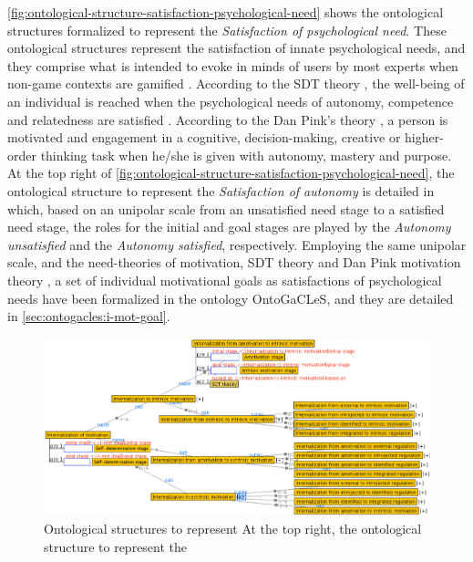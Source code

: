 \autoref{fig:ontological-structure-satisfaction-psychological-need} shows the ontological structures formalized to represent the \emph{Satisfaction of psychological need}.
These ontological structures represent the satisfaction of innate psychological needs, and they comprise what is intended to evoke in minds of users by most experts when non-game contexts are gamified \cite{MoraRieraGonzalezArnedo-Moreno2015,SeabornFels2015}.
According to the SDT theory \cite{RyanDeci2000,DeciRyan2010}, the well-being of an individual is reached when the psychological needs of autonomy, competence and relatedness are satisfied \cite{DeciRyan1985, DeciRyan2010}.
According to the Dan Pink's theory \cite{Pink2011}, a person is motivated and engagement in a cognitive, decision-making, creative or higher-order thinking task when he/she is given with autonomy, mastery and purpose.
At the top right of \autoref{fig:ontological-structure-satisfaction-psychological-need}, the ontological structure to represent the \emph{Satisfaction of autonomy} is detailed in which, based on an unipolar scale from an unsatisfied need stage to a satisfied need stage, the roles for the initial and goal stages are played by the \emph{Autonomy unsatisfied} and the \emph{Autonomy satisfied}, respectively.
Employing the same unipolar scale, and the need-theories of motivation, SDT theory \cite{DeciRyan2010} and Dan Pink motivation theory \cite{Pink2011}, a set of individual motivational goals as satisfactions of psychological needs have been formalized in the ontology OntoGaCLeS, and they are detailed in \autoref{sec:ontogacles:i-mot-goal}.

\begin{figure}[!htbp]
 \caption[Ontological structures to represent internalization of motivation]{Ontological structures to represent  At the top right, the ontological structure to represent the }
 \label{fig:ontological-structure-internalization-motivation}
 \centering
 \includegraphics[width=1\textwidth]{images/chap-ontogacles1/ontological-structure-internalization-motivation.png}
 \fautor
\end{figure}

